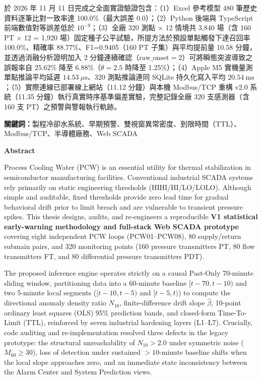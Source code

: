 \documentclass[fontset=none, a4paper, 12pt]{ctexart}
\begin{document}
於 2026 年 11 月 11 日完成之全面實證驗證包含：（1）Excel 參考模型 480 筆歷史資料逐筆比對一致率達 100.0\%（最大誤差 0.0）；（2）Python 後端與 TypeScript 前端數值對等誤差低於 $10^{-9}$；（3）全廠 320 測點 × 12 情境共 3,840 場（含 160 PT × 12 = 1,920 場）固定種子公平試驗，所提方法於預設單點觸發下達召回率 100.0\%、精確率 88.77\%、F1=0.9405（160 PT 子集）與平均提前量 10.58 分鐘，並透過消融分析證明加入 2 分鐘連續確認（$\text{raw\_onset}=2$）可將瞬態突波導致之誤報率自 25.62\% 降至 6.88\%（$\theta=2.5$ 時降至 1.25\%）；（4）Apple M5 實機量測單點推論平均延遲 $14.53\ \mu\mathrm{s}$、320 測點推論連同 SQLite 持久化寫入平均 $20.54\ \mathrm{ms}$；（5）實際連線已部署線上網站（11.12 分鐘）與本機 Modbus/TCP 重構 v2.0 系統（11.35 分鐘）執行真實時序基準偏差實驗，完整記錄全廠 320 支感測器（含 160 支 PT）之預警與警報執行軌跡。

\vspace{1em}
\noindent \textbf{關鍵詞：}製程冷卻水系統、早期預警、雙視窗異常密度、到限時間（TTL）、Modbus/TCP、半導體廠務、Web SCADA

\newpage

{}
\begin{center}
\large\bfseries Abstract
\end{center}
\vspace{0.5em}

Process Cooling Water (PCW) is an essential utility for thermal stabilization in semiconductor manufacturing facilities. Conventional industrial SCADA systems rely primarily on static engineering thresholds (HIHI/HI/LO/LOLO). Although simple and auditable, fixed thresholds provide zero lead time for gradual behavioral drift prior to limit breach and are vulnerable to transient pressure spikes. This thesis designs, audits, and re-engineers a reproducible \textbf{V1 statistical early-warning methodology and full-stack Web SCADA prototype} covering eight independent PCW loops (PCW01--PCW08), 80 supply/return submain pairs, and 320 monitoring points (160 pressure transmitters PT, 80 flow transmitters FT, and 80 differential pressure transmitters PDT).

The proposed inference engine operates strictly on a causal Past-Only 70-minute sliding window, partitioning data into a 60-minute baseline $[t-70, t-10)$ and two 5-minute local segments ($[t-10, t-5)$ and $[t-5, t)$) to compute the directional anomaly density ratio $N_{10}$, finite-difference drift slope $\hat{\beta}$, 10-point ordinary least squares (OLS) 95\% prediction bands, and closed-form Time-To-Limit (TTL), reinforced by seven industrial hardening layers (L1--L7). Crucially, code auditing and re-implementation resolved three defects in the legacy prototype: the structural unreachability of $N_{10} > 2.0$ under symmetric noise ($M_{60} \ge 30$), loss of detection under sustained $>10$-minute baseline shifts when the local slope approaches zero, and an immediate state inconsistency between the Alarm Center and System Prediction views.
\end{document}
